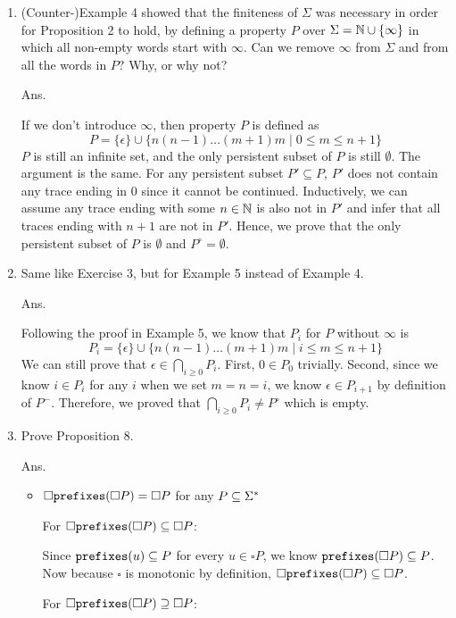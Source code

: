 \documentclass{article}
\begin{document}
\begin{enumerate}
\item (Counter-)Example 4 showed that the finiteness of $\Sigma$ was necessary
in order for Proposition 2 to hold, by defining a property $P$ over
$\Sigma = \mathbb{N}\cup\{\infty\}$ in which all non-empty words start with $\infty$.
Can we remove $\infty$ from $\Sigma$ and from all the words in $P$?
Why, or why not?

Ans.

If we don't introduce $\infty$, then property $P$ is defined as
$$
P = \{\epsilon\} \cup \{n(n-1)\dots(m+1)m \mid 0 \leq m \leq n+1 \}
$$
$P$ is still an infinite set, and the only persistent subset of $P$
is still $\emptyset$.
The argument is the same. For any persistent subset $P' \subseteq P$,
$P'$ does not contain any trace ending in $0$ since it cannot be continued.
Inductively, we can assume any trace ending with some $n \in \mathbb{N}$ is also
not in $P'$ and infer that all traces ending with $n+1$ are not in $P'$.
Hence, we prove that the only persistent subset of $P$ is $\emptyset$
and $P^{\circ} = \emptyset$.


\item Same like Exercise 3, but for Example 5 instead of Example 4.

Ans.

Following the proof in Example 5, we know that $P_i$ for $P$ without $\infty$ is
$$
P_i = \{\epsilon\} \cup \{n(n-1)\dots(m+1)m \mid i \leq m \leq n+1 \}
$$
We can still prove that $\epsilon \in \bigcap_{i\geq 0} P_i$.
First, $0 \in P_0$ trivially.
Second, since we know $i \in P_i$ for any $i$ when we set $m = n = i$,
we know $\epsilon \in P_{i+1}$ by definition of $P^-$.
Therefore, we proved that $\bigcap_{i\geq 0} P_i \neq P^{\circ}$ which is empty.


\item Prove Proposition 8.

Ans.

\begin{itemize}
\item $\square \mathtt{prefixes}(\square P) = \square P$ for any $P \subseteq \Sigma^*$

\medskip
For $\square \mathtt{prefixes}(\square P) \subseteq \square P$:

Since $\mathtt{prefixes}(u) \subseteq P$ for every $u \in \square P$,
we know $\mathtt{prefixes}(\square P) \subseteq P$.
Now because $\square$ is monotonic by definition,
$\square \mathtt{prefixes}(\square P) \subseteq \square P$.

\medskip
For $\square \mathtt{prefixes}(\square P) \supseteq \square P$:


\end{itemize}
\end{enumerate}
\end{document}
